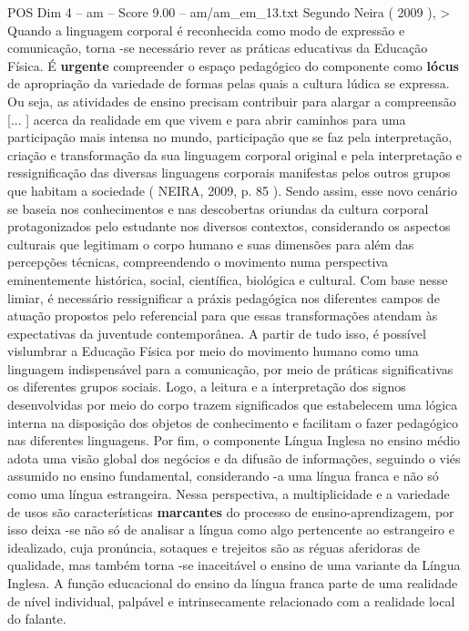 \begin{textsample}{POS Dim 4 – am – Score 9.00 – am/am\_em\_13.txt}
Segundo Neira ( 2009 ), > Quando a linguagem corporal é reconhecida como modo de expressão e comunicação, torna -se necessário rever as práticas educativas da Educação Física.
É \textbf{urgente} compreender o espaço pedagógico do componente como \textbf{lócus} de apropriação da variedade de formas pelas quais a cultura lúdica se expressa.
Ou seja, as atividades de ensino precisam contribuir para alargar a compreensão [... ] acerca da realidade em que vivem e para abrir caminhos para uma participação mais intensa no mundo, participação que se faz pela interpretação, criação e transformação da sua linguagem corporal original e pela interpretação e ressignificação das diversas linguagens corporais manifestas pelos outros grupos que habitam a sociedade ( NEIRA, 2009, p. 85 ).
Sendo assim, esse novo cenário se baseia nos conhecimentos e nas descobertas oriundas da cultura corporal protagonizados pelo estudante nos diversos contextos, considerando os aspectos culturais que legitimam o corpo humano e suas dimensões para além das percepções técnicas, compreendendo o movimento numa perspectiva eminentemente histórica, social, científica, biológica e cultural.
Com base nesse limiar, é necessário ressignificar a práxis pedagógica nos diferentes campos de atuação propostos pelo referencial para que essas transformações atendam às expectativas da juventude contemporânea.
A partir de tudo isso, é possível vislumbrar a Educação Física por meio do movimento humano como uma linguagem indispensável para a comunicação, por meio de práticas significativas os diferentes grupos sociais.
Logo, a leitura e a interpretação dos signos desenvolvidas por meio do corpo trazem significados que estabelecem uma lógica interna na disposição dos objetos de conhecimento e facilitam o fazer pedagógico nas diferentes linguagens.
Por fim, o componente Língua Inglesa no ensino médio adota uma visão global dos negócios e da difusão de informações, seguindo o viés assumido no ensino fundamental, considerando -a uma língua franca e não só como uma língua estrangeira.
Nessa perspectiva, a multiplicidade e a variedade de usos são características \textbf{marcantes} do processo de ensino-aprendizagem, por isso deixa -se não só de analisar a língua como algo pertencente ao estrangeiro e idealizado, cuja pronúncia, sotaques e trejeitos são as réguas aferidoras de qualidade, mas também torna -se inaceitável o ensino de uma variante da Língua Inglesa.
A função educacional do ensino da língua franca parte de uma realidade de nível individual, palpável e intrinsecamente relacionado com a realidade local do falante.

\end{textsample}
